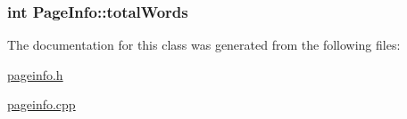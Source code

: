 \subsubsection[{total\+Words}]{\setlength{\rightskip}{0pt plus 5cm}int Page\+Info\+::total\+Words\hspace{0.3cm}{\ttfamily [private]}}\label{class_page_info_aca7e985b3d5879e5bbe030b63a523393}


The documentation for this class was generated from the following files\+:\begin{DoxyCompactItemize}
\item 
\hyperlink{pageinfo_8h}{pageinfo.\+h}\item 
\hyperlink{pageinfo_8cpp}{pageinfo.\+cpp}\end{DoxyCompactItemize}
